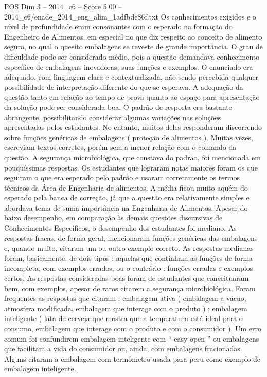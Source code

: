 \begin{textsample}{POS Dim 3 – 2014\_c6 – Score 5.00 – 2014\_c6/enade\_2014\_eng\_alim\_1adfbde86f.txt}
Os conhecimentos exigidos e o nível de profundidade eram consonantes com o esperado na formação do Engenheiro de Alimentos, em especial no que diz respeito ao conceito de alimento seguro, no qual o quesito embalagens se reveste de grande importância.
O grau de dificuldade pode ser considerado médio, pois a questão demandava conhecimento específico de embalagens inovadoras, suas funções e exemplos.
O enunciado era adequado, com linguagem clara e contextualizada, não sendo percebida qualquer possibilidade de interpretação diferente do que se esperava.
A adequação da questão tanto em relação ao tempo de prova quanto ao espaço para apresentação da solução pode ser considerada boa.
O padrão de resposta era bastante abrangente, possibilitando considerar algumas variações nas soluções apresentadas pelos estudantes.
No entanto, muitos deles responderam discorrendo sobre funções genéricas de embalagens ( proteção de alimentos ).
Muitas vezes, escreviam textos corretos, porém sem a menor relação com o comando da questão.
A segurança microbiológica, que constava do padrão, foi mencionada em pouquíssimas respostas.
Os estudantes que lograram notas maiores foram os que seguiram o que era esperado pelo padrão e usaram corretamente os termos técnicos da Área de Engenharia de alimentos.
A média ficou muito aquém do esperado pela banca de correção, já que a questão era relativamente simples e abordava tema de suma importância na Engenharia de Alimentos.
Apesar do baixo desempenho, em comparação às demais questões discursivas de Conhecimentos Específicos, o desempenho dos estudantes foi mediano.
As respostas fracas, de forma geral, mencionaram funções genéricas das embalagens e, quando muito, citaram um ou outro exemplo correto.
As respostas medianas foram, basicamente, de dois tipos : aquelas que continham as funções de forma incompleta, com exemplos errados, ou o contrário : funções erradas e exemplos certos.
As respostas consideradas boas foram de estudantes que conceituaram bem, com exemplos, apesar de raros citarem a segurança microbiológica.
Foram frequentes as respostas que citaram : embalagem ativa ( embalagem a vácuo, atmosfera modificada, embalagem que interage com o produto ) ; embalagem inteligente ( lata de cerveja que mostra que a temperatura está ideal para o consumo, embalagem que interage com o produto e com o consumidor ).
Um erro comum foi confundirem embalagem inteligente com “ easy open ” ou embalagens que facilitam a vida do consumidor ou, ainda, com embalagens fracionadas.
Alguns citaram a embalagem com termômetro usada para peru como exemplo de embalagem inteligente.

\end{textsample}
